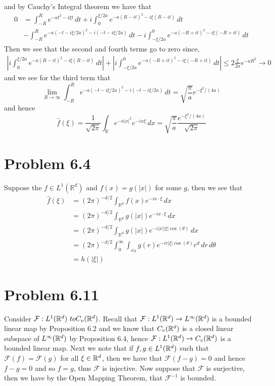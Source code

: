 \documentclass[12pt]{report}
\newcommand{\FT}{\mathcal{F}}
\begin{document}
and by Cauchy's Integral theorem we have that 
\begin{align*}
  0 &= \int_{-R}^R e^{-at^2 -i\xi t} \, dt + i\int_{0}^{\xi/2a} e^{-a(R - it)^2 - i\xi(R - it)} \, dt \\
                                   &- \int_{-R}^R e^{-a(-t - i\xi/2a)^2 - i(-t - i\xi/2a)} \, dt  - i\int_{-\xi/2a}^0 e^{-a(-R + it)^2 - i\xi(-R + it)} \, dt
\end{align*}
Then we see that the second and fourth terms go to zero since,
\begin{align*}
  \left\lvert i\int_{0}^{\xi/2a} e^{-a(R - it)^2 - i\xi(R - it)} \, dt \right\rvert + \left\lvert i\int_{-\xi/2a}^0 e^{-a(-R + it)^2 - i\xi(-R + it)} \, dt\right\rvert \leq 2\frac{\xi}{2a} e^{-aR^2} \to 0
\end{align*}
and we see for the third term that 
\begin{equation*}
  \lim_{R \to \infty} \int_{-R}^R e^{-a(-t - i\xi/2a)^2 - i(-t - i\xi/2a)} \, dt =\sqrt{\frac{\pi}{a}} e^{-\xi^2/(4a)}
\end{equation*}
and hence 
\begin{equation*}
  \hat{f}(\xi) = \frac{1}{\sqrt{2\pi}} \int_{\mathbb{R}} e^{-a|x|^2} e^{-ix\xi} \, dx = \sqrt{\frac{\pi}{a}} \frac{e^{-\xi^2/(4a)}}{\sqrt{2\pi}}
\end{equation*}
\section*{Problem 6.4}
Suppose the $f \in L^1(\mathbb{R}^d)$ and $f(x) = g(|x|)$ for some $g$, then we see that
\begin{align*}
  \hat{f}(\xi) &= (2\pi)^{-d/2} \int_{\mathbb{R}^d} f(x)e^{-i x \cdot \xi} \, dx \\
               &=(2\pi)^{-d/2} \int_{\mathbb{R}^d} g(|x|)e^{-i x \cdot \xi} \, dx \\
               &=(2\pi)^{-d/2} \int_{\mathbb{R}^d} g(|x|)e^{-i |x||\xi| \cos(\theta)} \, dx \\
               &=(2\pi)^{-d/2} \int_0^\infty \int_{\omega_d} g(r)e^{-i r|\xi| \cos(\theta)} r^{d} \, dr\, d\theta \\
               &= h(|\xi|)
\end{align*}

\section*{Problem 6.11}
Consider $\FT: L^1(\R^d) \ to C_v(\R^d)$. Recall that $\FT: L^1(\R^d) \to L^\infty(\R^d)$ is a bounded linear map by Proposition 6.2 and we know that $C_v(\mathbb{R}^d)$ is a closed linear subspace of $L^\infty(\mathbb{R}^d)$ by Proposition 6.4, hence $\FT: L^1(\R^d) \to C_v(\R^d)$ is a bounded linear map. Next we note that if $f,g \in L^1(\mathbb{R}^d)$ such that $\FT(f) = \FT(g)$ for all $\xi \in \mathbb{R}^d$, then we have that $\FT(f - g) = 0$ and hence $f - g = 0$ and so $f = g$, thus $\FT$ is injective. Now suppose that $\FT$ is surjective, then we have by the Open Mapping Theorem, that $\FT^{-1}$ is bounded. 
\end{document}
